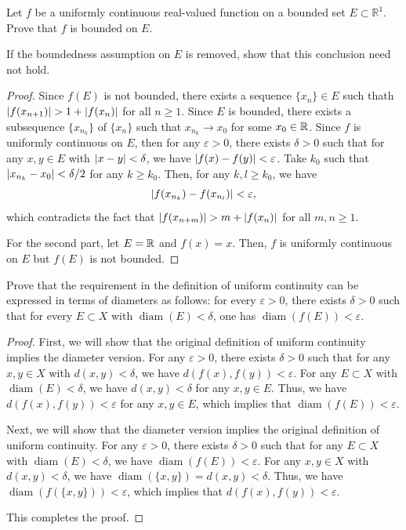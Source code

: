 \documentclass{article}
\begin{document}
\begin{problem}[4-8]
Let $f$ be a uniformly continuous real-valued function on a bounded set $E\subset \mathbb{R}^1$. Prove that $f$ is bounded on $E$.

If the boundedness assumption on $E$ is removed, show that this conclusion need not hold.
\end{problem}

\begin{proof}
  Since \( f(E) \) is not bounded, there exists a sequence \( \{x_n\}\in E \) such thath \( \abs{f(x_{n+1})}>1+\abs{f(x_{n})} \) for all \( n\ge 1 \). Since \( E \) is bounded, there exists a subsequence \( \{x_{n_k}\} \) of \( \{x_n\} \) such that \( x_{n_k}\to x_0 \) for some \( x_0\in\mathbb{R} \). Since \( f \) is uniformly continuous on \( E \), then for any \( \varepsilon>0 \), there exists \( \delta>0 \) such that for any \( x,y\in E \) with \( \left|x-y\right|<\delta \), we have \( \left|f(x)-f(y)\right|<\varepsilon \). Take \( k_0 \) such that \( \left|x_{n_k}-x_0\right|<\delta/2 \) for any \( k\ge k_0 \). Then, for any \( k,l\ge k_0 \), we have
  \[\left|f(x_{n_k})-f(x_{n_l})\right|<\varepsilon, \]
  which contradicts the fact that \( \abs{f(x_{n+m})}>m+\abs{f(x_{n})} \) for all \( m,n\ge 1 \).\par
  For the second part, let \( E=\mathbb{R} \) and \( f(x)=x \). Then, \( f \) is uniformly continuous on \( E \) but \( f(E) \) is not bounded.
\end{proof}



\begin{problem}[4-9]
Prove that the requirement in the definition of uniform continuity can be expressed in terms of diameters as follows: for every $\varepsilon>0$, there exists $\delta>0$ such that for every $E\subset X$ with $\operatorname{diam}(E)<\delta$, one has $\operatorname{diam}(f(E))<\varepsilon$.
\end{problem}

\begin{proof}
  First, we will show that the original definition of uniform continuity implies the diameter version. For any \( \varepsilon>0 \), there exists \( \delta>0 \) such that for any \( x,y\in X \) with \( d(x,y)<\delta \), we have \( d(f(x),f(y))<\varepsilon \). For any \( E\subset X \) with \( \operatorname{diam}(E)<\delta \), we have \( d(x,y)<\delta \) for any \( x,y\in E \). Thus, we have \( d(f(x),f(y))<\varepsilon \) for any \( x,y\in E \), which implies that \( \operatorname{diam}(f(E))<\varepsilon \).\par
  Next, we will show that the diameter version implies the original definition of uniform continuity. For any \( \varepsilon>0 \), there exists \( \delta>0 \) such that for any \( E\subset X \) with \( \operatorname{diam}(E)<\delta \), we have \( \operatorname{diam}(f(E))<\varepsilon \). For any \( x,y\in X \) with \( d(x,y)<\delta \), we have \( \operatorname{diam}(\{x,y\})=d(x,y)<\delta \). Thus, we have \( \operatorname{diam}(f(\{x,y\}))<\varepsilon \), which implies that \( d(f(x),f(y))<\varepsilon \).\par
  This completes the proof.
\end{proof}
\end{document}
